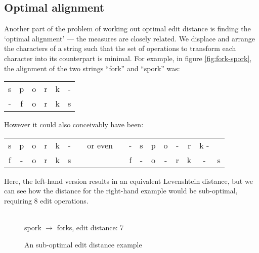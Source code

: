 \subsection*{Optimal alignment}
Another part of the problem of working out optimal edit distance is
finding the `optimal alignment' --- the measures are closely
related. We displace and arrange the characters of a string such that
the set of operations to transform each character into its counterpart
is minimal. For example, in figure \ref{fig:fork-spork}, the alignment
of the two strings ``fork'' and ``spork'' was:

\begin{center}
  \begin{tabular}{cccccc}
    s & p & o & r & k & -\\
    - & f & o & r & k & s 
  \end{tabular}
\end{center}

However it could also conceivably have been:

\begin{center}
  \begin{tabular}{ccccccccccccccccc}
    s & p & o & r & k & - & & or even & & - & s & p & o & - & r & k - &\\
    f & - & o & r & k & s & &         & & f & - & o & - & r & k & - & s    
  \end{tabular}
\end{center}\label{fig:sub-opt}

Here, the left-hand version results in an equivalent Levenshtein
distance, but we can see how the distance for the right-hand example
would be sub-optimal, requiring 8 edit operations.

\begin{figure}[h]
  \centering   
  \\
  \vspace{3 mm}
  spork $\rightarrow$ forks, edit distance: 7
  \caption{An sub-optimal edit distance example}
  \label{fig:fork-spork-subopt}
\end{figure}

